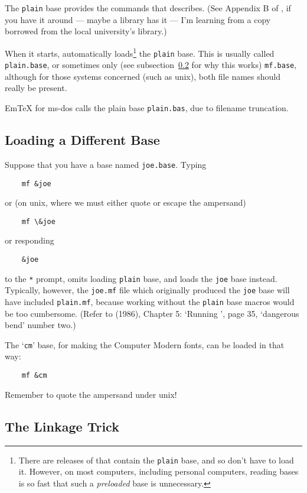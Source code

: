 The {\tt plain} base provides the commands that \MFbook{}
describes.  (See Appendix B of \MFbook{}, if you have it around
--- maybe a library has it --- I'm learning from a copy borrowed from the
local university's library.)

When it starts, \MF{} automatically loads\footnote
{There are releases of \MF{} that contain the {\tt plain} base,
and so don't have to load it.  However, on most computers, including
personal computers, reading bases is so fast that such a {\em preloaded\/}
base is unnecessary.}
the {\tt plain} base.
This is usually called {\tt plain.base}, or sometimes only (see
subsection~\ref{sub:link} for why this works) {\tt mf.base},
although for those systems concerned (such as {\sc unix}),
both file names should really be present.

Em\TeX{} for {\sc ms-dos} calls the plain base {\tt plain.bas},
due to filename truncation.


\subsection{Loading a Different Base}\label{sub:loading}

Suppose that you have a base named {\tt joe.base}.
Typing
\begin{verbatim}
    mf &joe
\end{verbatim}
or (on unix, where we must either quote or escape the ampersand)
\begin{verbatim}
    mf \&joe
\end{verbatim}
or responding
\begin{verbatim}
    &joe
\end{verbatim}
to the {\tt **} prompt,
omits loading {\tt plain} base, and loads the {\tt joe} base instead.
Typically, however, the {\tt joe.mf} file which originally produced
the {\tt joe} base will have included {\tt plain.mf}, because working
without the {\tt plain} base macros would be too cumbersome.
(Refer to \MFbook{} (1986), Chapter 5: `Running \MF{}', page 35,
`dangerous bend' number two.)

The `{\tt cm}' base, for making the {\sc Computer Modern} fonts,
can be loaded in that way:
\begin{verbatim}
    mf &cm
\end{verbatim}
Remember to quote the ampersand under {\sc unix}!


\subsection{The Linkage Trick}\label{sub:link}

